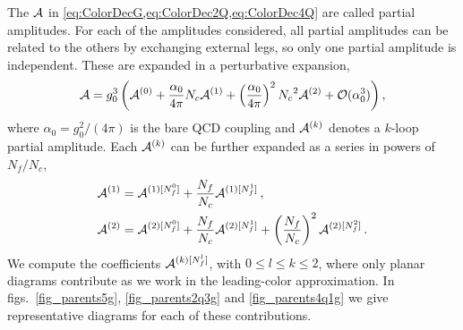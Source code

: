 The $\mathcal{A}$ in \cref{eq:ColorDecG,eq:ColorDec2Q,eq:ColorDec4Q} are
called partial amplitudes. For each of the amplitudes considered, all
partial amplitudes can be related to the others by exchanging external
legs, so only one partial amplitude is independent. These are expanded in a perturbative
expansion,
\begin{equation}
    \label{eq:partials} 
    \mathcal{A}
    = g^{3}_0 \left(
        \mathcal{A}^{(0)}
      + \frac{\alpha_0}{4\pi}{N_c} \mathcal{A}^{(1)}
      + \left(\frac{\alpha_0}{4\pi}\right)^2{N_c}^2  \mathcal{A}^{(2)} 
      + \mathcal{O}(\alpha_0^3)
      \right),
\end{equation}
where $\alpha_0=g_0^2/(4\pi)$ is the bare QCD coupling and 
$\mathcal{A}^{(k)}$ denotes a $k$-loop partial amplitude. Each 
$\mathcal{A}^{(k)}$ can be further expanded as a series in powers of 
$N_f/N_c$,
\begin{align}
  \label{eq:nfdecomposition} 
  \begin{split}
  \mathcal{A}^{(1)} &= \mathcal{A}^{(1)[N_f^0]} + 
  \frac{{N_f}}{{N_c}}\mathcal{A}^{(1)[N_f^1]}\,, \\
  \mathcal{A}^{(2)} &= \mathcal{A}^{(2)[N_f^0]} +
  \frac{{N_f}}{{N_c}}\mathcal{A}^{(2)[N_f^1]} +
  \left(\frac{{N_f}}{{N_c}}\right)^2\mathcal{A}^{(2)[N_f^2]}\,.
  \end{split} 
\end{align}
We compute the coefficients $\mathcal{A}^{(k)[N_f^l]}$, with $0\leq l\leq
k\leq2$, where only planar diagrams contribute as we work in the
leading-color approximation. In figs.~\ref{fig_parents5g},
\ref{fig_parents2q3g} and \ref{fig_parents4q1g} we give representative
diagrams for each of these contributions.

